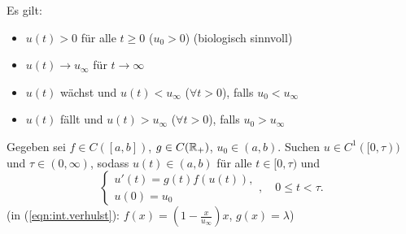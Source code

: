 \documentclass[12pt]{scrreprt}
\begin{document}
\noindent Es gilt:
\begin{itemize}
\item $u(t)>0$ für alle $t\ge0$ ($u_0>0$) (biologisch sinnvoll)
\item $u(t) \to u_\infty$ für $t\to\infty$
\item $u(t)$ wächst und $u(t)<u_\infty$ ($\forall t>0$), falls
  $u_0<u_\infty$
\item $u(t)$ fällt und $u(t)>u_\infty$ ($\forall t>0$), falls
  $u_0>u_\infty$
\end{itemize}

\noindent Gegeben sei $f\in C([a,b])$, $g\in C(\mathbb{R}_+)$,
$u_0\in(a,b)$. Suchen $u\in C^1([0,\tau))$ und $\tau\in(0,\infty)$,
sodass $u(t)\in(a,b)$ für alle $t\in[0,\tau)$ und
\begin{equation}
  \label{eqn:int.tv}
  \begin{cases} u'(t)=g(t)f(u(t)),\\u(0)=u_0 \end{cases},
  \quad 0 \le t < \tau.
\end{equation}
(in (\ref{eqn:int.verhulst}):
$f(x)=\left(1-\frac{x}{u_\infty}\right)x$, $g(x)=\lambda$)
\end{document}
